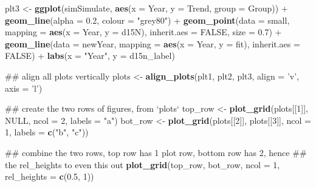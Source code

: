 \documentclass[12pt,]{article}
\newenvironment{Shaded}{\begin{snugshade}}{\end{snugshade}}
\newcommand{\KeywordTok}[1]{\textcolor[rgb]{0.13,0.29,0.53}{\textbf{{#1}}}}
\newcommand{\DataTypeTok}[1]{\textcolor[rgb]{0.13,0.29,0.53}{{#1}}}
\newcommand{\DecValTok}[1]{\textcolor[rgb]{0.00,0.00,0.81}{{#1}}}
\newcommand{\FloatTok}[1]{\textcolor[rgb]{0.00,0.00,0.81}{{#1}}}
\newcommand{\StringTok}[1]{\textcolor[rgb]{0.31,0.60,0.02}{{#1}}}
\newcommand{\OtherTok}[1]{\textcolor[rgb]{0.56,0.35,0.01}{{#1}}}
\newcommand{\NormalTok}[1]{{#1}}
\begin{document}
\begin{Shaded}
\begin{Highlighting}[]
\NormalTok{plt3 <-}\StringTok{ }\KeywordTok{ggplot}\NormalTok{(simSimulate, }\KeywordTok{aes}\NormalTok{(}\DataTypeTok{x =} \NormalTok{Year, }\DataTypeTok{y =} \NormalTok{Trend, }\DataTypeTok{group =} \NormalTok{Group)) +}
\StringTok{    }\KeywordTok{geom_line}\NormalTok{(}\DataTypeTok{alpha =} \FloatTok{0.2}\NormalTok{, }\DataTypeTok{colour =} \StringTok{"grey80"}\NormalTok{) +}
\StringTok{    }\KeywordTok{geom_point}\NormalTok{(}\DataTypeTok{data =} \NormalTok{small,}
               \DataTypeTok{mapping =} \KeywordTok{aes}\NormalTok{(}\DataTypeTok{x =} \NormalTok{Year, }\DataTypeTok{y =} \NormalTok{d15N),}
               \DataTypeTok{inherit.aes =} \OtherTok{FALSE}\NormalTok{,}
               \DataTypeTok{size =} \FloatTok{0.7}\NormalTok{) +}
\StringTok{    }\KeywordTok{geom_line}\NormalTok{(}\DataTypeTok{data =} \NormalTok{newYear,}
              \DataTypeTok{mapping =} \KeywordTok{aes}\NormalTok{(}\DataTypeTok{x =} \NormalTok{Year, }\DataTypeTok{y =} \NormalTok{fit),}
              \DataTypeTok{inherit.aes =} \OtherTok{FALSE}\NormalTok{) +}
\StringTok{    }\KeywordTok{labs}\NormalTok{(}\DataTypeTok{x =} \StringTok{"Year"}\NormalTok{, }\DataTypeTok{y =} \NormalTok{d15n_label)}

\NormalTok{## align all plots vertically}
\NormalTok{plots <-}\StringTok{ }\KeywordTok{align_plots}\NormalTok{(plt1, plt2, plt3, }\DataTypeTok{align =} \StringTok{'v'}\NormalTok{, }\DataTypeTok{axis =} \StringTok{'l'}\NormalTok{)}


\NormalTok{## create the two rows of figures, from `plots`}
\NormalTok{top_row <-}\StringTok{ }\KeywordTok{plot_grid}\NormalTok{(plots[[}\DecValTok{1}\NormalTok{]], }\OtherTok{NULL}\NormalTok{, }\DataTypeTok{ncol =} \DecValTok{2}\NormalTok{, }\DataTypeTok{labels =} \StringTok{"a"}\NormalTok{)}
\NormalTok{bot_row <-}\StringTok{ }\KeywordTok{plot_grid}\NormalTok{(plots[[}\DecValTok{2}\NormalTok{]], plots[[}\DecValTok{3}\NormalTok{]], }\DataTypeTok{ncol =} \DecValTok{1}\NormalTok{, }\DataTypeTok{labels =} \KeywordTok{c}\NormalTok{(}\StringTok{"b"}\NormalTok{, }\StringTok{"c"}\NormalTok{))}

\NormalTok{## combine the two rows, top row has 1 plot row, bottom row has 2, hence}
\NormalTok{## the rel_heights to even this out}
\KeywordTok{plot_grid}\NormalTok{(top_row, bot_row, }\DataTypeTok{ncol =} \DecValTok{1}\NormalTok{, }\DataTypeTok{rel_heights =} \KeywordTok{c}\NormalTok{(}\FloatTok{0.5}\NormalTok{, }\DecValTok{1}\NormalTok{))}
\end{Highlighting}
\end{Shaded}
\end{document}
